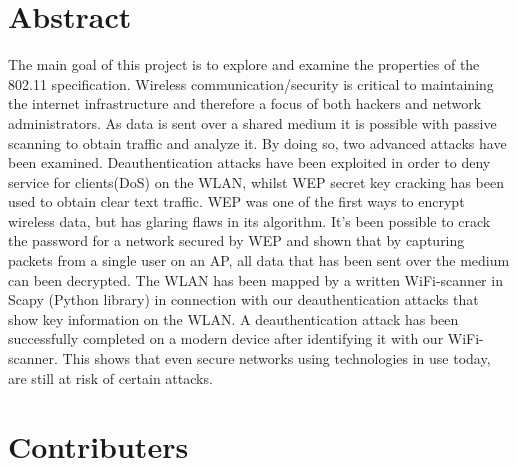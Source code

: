 
\section*{Abstract}
The main goal of this project is to explore and examine the properties of the 802.11 specification. Wireless communication/security is critical to maintaining the internet infrastructure and therefore a focus of both hackers and network administrators. As data is sent over a shared medium it is possible with passive scanning to obtain traffic and analyze it. By doing so, two advanced attacks have been examined. Deauthentication attacks have been exploited in order to deny service for clients(DoS) on the WLAN, whilst WEP secret key cracking has been used to obtain clear text traffic. WEP was one of the first ways to encrypt wireless data, but has glaring flaws in its algorithm. It's been possible to crack the password for a network secured by WEP and shown that by capturing packets from a single user on an AP, all data that has been sent over the medium can been decrypted. The WLAN has been mapped by a written WiFi-scanner in Scapy (Python library) in connection with our deauthentication attacks that show key information on the WLAN. A deauthentication attack has been successfully completed on a modern device after identifying it with our WiFi-scanner. This shows that even secure networks using technologies in use today, are still at risk of certain attacks.

\newpage
\tableofcontents
\newpage

\section{Contributers}

